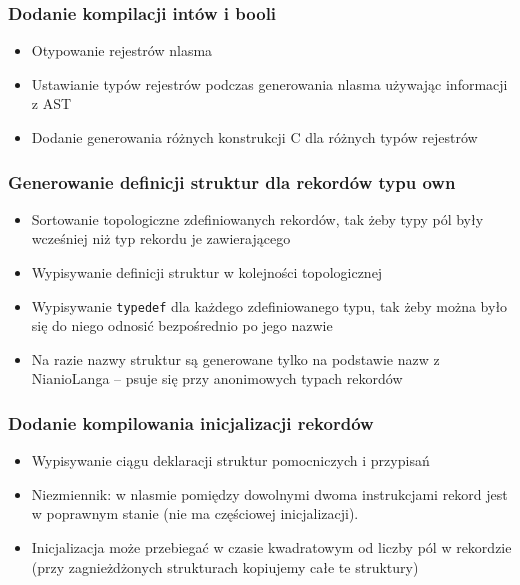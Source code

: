 \documentclass{beamer}
\begin{document}
	\begin{frame}
		\frametitle{Dodanie kompilacji intów i booli}
		\begin{itemize}
			\item Otypowanie rejestrów nlasma
			\item Ustawianie typów rejestrów podczas generowania nlasma używając informacji z AST
			\item Dodanie generowania różnych konstrukcji C dla różnych typów rejestrów
		\end{itemize}
	\end{frame}

	\begin{frame}
		\frametitle{Generowanie definicji struktur dla rekordów typu own}
		\begin{itemize}
			\item Sortowanie topologiczne zdefiniowanych rekordów, tak żeby typy pól były wcześniej
			niż typ rekordu je zawierającego
			\item Wypisywanie definicji struktur w kolejności topologicznej
			\item Wypisywanie \texttt{typedef} dla każdego zdefiniowanego typu, tak żeby można było się
			do niego odnosić bezpośrednio po jego nazwie
			\item Na razie nazwy struktur są generowane tylko na podstawie nazw z NianioLanga
			-- psuje się przy anonimowych typach rekordów
		\end{itemize}
	\end{frame}

	\begin{frame}
		\frametitle{Dodanie kompilowania inicjalizacji rekordów}
		\begin{itemize}
			\item Wypisywanie ciągu deklaracji struktur pomocniczych i przypisań
			\item Niezmiennik: w nlasmie pomiędzy dowolnymi dwoma instrukcjami rekord jest w
			poprawnym stanie (nie ma częściowej inicjalizacji).
			\item Inicjalizacja może przebiegać w czasie kwadratowym od liczby pól w rekordzie
			(przy zagnieżdżonych strukturach kopiujemy całe te struktury)
		\end{itemize}
	\end{frame}
	
\end{document}
